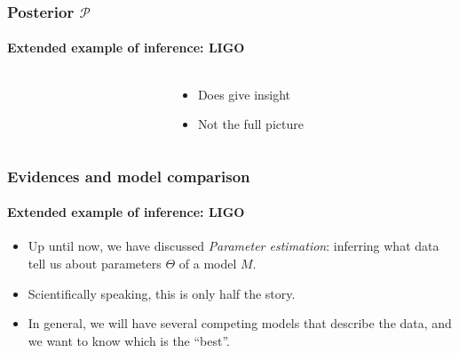 \documentclass[%
]{beamer}
\begin{document}
\begin{frame}
    \frametitle{Posterior $\mathcal{P}$}
    \framesubtitle{Extended example of inference: LIGO}
	\begin{columns}
	\begin{column}{0.7\textwidth}
	\end{column}
	\begin{column}{0.3\textwidth}
		\begin{itemize}
          \item<2-> Does give insight
          \item<3-> Not the full picture
		\end{itemize}
	\end{column}
	\end{columns}
\end{frame}

\begin{frame}
    \frametitle{Evidences and model comparison}
    \framesubtitle{Extended example of inference: LIGO}

    \begin{itemize}
        \pause\item Up until now, we have discussed {\em Parameter estimation\/}: inferring what data tell us about parameters $\Theta$ of a model $M$.
        \pause\item Scientifically speaking, this is only half the story.
        \pause\item In general, we will have several competing models that describe the data, and we want to know which is the ``best''.
    \end{itemize}
\end{frame}
\end{document}
